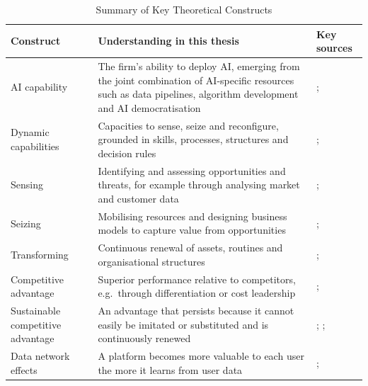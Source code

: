 \begin{table}[H]
  \centering
  \caption{Summary of Key Theoretical Constructs}
  \label{tab:constructs}
  \small{}
  \begin{tabularx}{\textwidth}{>{\raggedright\arraybackslash}p{3.0cm}>{\raggedright\arraybackslash}X>{\raggedright\arraybackslash}p{3.6cm}}
    \toprule
    \textbf{Construct} & \textbf{Understanding in this thesis} & \textbf{Key sources} \\
    \midrule
    AI capability & The firm's ability to deploy AI, emerging from the joint combination of AI-specific resources such as data pipelines, algorithm development and AI democratisation & \textcite[1]{mikalef2021capability}; \textcite[574]{sjodin2021} \\
    \addlinespace
    Dynamic capabilities & Capacities to sense, seize and reconfigure, grounded in skills, processes, structures and decision rules & \textcite[509]{teece1997}; \textcite[1319]{teece2007} \\
    \addlinespace
    Sensing & Identifying and assessing opportunities and threats, for example through analysing market and customer data & \textcite[1319]{teece2007}; \textcite[240]{hossain2022} \\
    \addlinespace
    Seizing & Mobilising resources and designing business models to capture value from opportunities & \textcite[1319]{teece2007}; \textcite[40]{teece2018} \\
    \addlinespace
    Transforming & Continuous renewal of assets, routines and organisational structures & \textcite[1319]{teece2007}; \textcite[1]{huang2026} \\
    \addlinespace
    Competitive advantage & Superior performance relative to competitors, e.g.\ through differentiation or cost leadership & \textcite[99]{barney1991}; \textcite[1]{bunea2026} \\
    \addlinespace
    Sustainable competitive advantage & An advantage that persists because it cannot easily be imitated or substituted and is continuously renewed & \textcite[99]{barney1991}; \textcite[179]{peteraf1993}; \textcite[1319]{teece2007} \\
    \addlinespace
    Data network effects & A platform becomes more valuable to each user the more it learns from user data & \textcite[534]{gregory2021}; \textcite[187]{chen2026} \\
    \bottomrule
  \end{tabularx}
\end{table}

